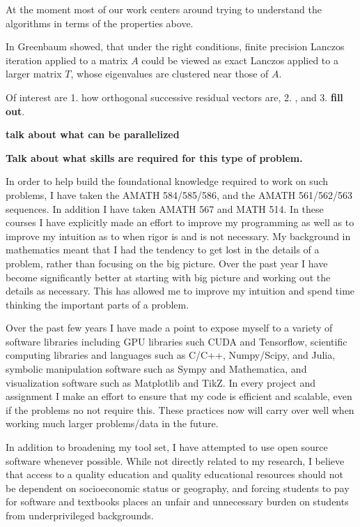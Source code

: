 \documentclass[11pt]{article}
\begin{document}
At the moment most of our work centers around trying to understand the algorithms in terms of the properties above. 

In \cite{perturbed_lanczos} Greenbaum showed, that under the right conditions, finite precision Lanczos iteration applied to a matrix \( A \) could be viewed as exact Lanczos applied to a larger matrix \( T \), whose eigenvalues are clustered near those of \( A \).

Of interest are 1. how orthogonal successive residual vectors are, 2. , and 3. \textbf{fill out}.


\textbf{talk about what can be parallelized}


\textbf{Talk about what skills are required for this type of problem.}




In order to help build the foundational knowledge required to work on such problems, I have taken the AMATH 584/585/586, and the AMATH 561/562/563 sequences. In addition I have taken AMATH 567 and MATH 514. In these courses I have explicitly made an effort to improve my programming as well as to improve my intuition as to when rigor is and is not necessary. My background in mathematics meant that I had the tendency to get lost in the details of a problem, rather than focusing on the big picture. Over the past year I have become significantly better at starting with big picture and working out the details as necessary. This has allowed me to improve my intuition and spend time thinking the important parts of a problem.

Over the past few years I have made a point to expose myself to a variety of software libraries including GPU libraries such CUDA and Tensorflow, scientific computing libraries and languages such as C/C++, Numpy/Scipy, and Julia, symbolic manipulation software such as Sympy and Mathematica, and visualization software such as Matplotlib and TikZ. In every project and assignment I make an effort to ensure that my code is efficient and scalable, even if the problems no not require this. These practices now will carry over well when working much larger problems/data in the future.

In addition to broadening my tool set, I have attempted to use open source software whenever possible. While not directly related to my research, I believe that access to a quality education and quality educational resources should not be dependent on socioeconomic status or geography, and forcing students to pay for software and textbooks places an unfair and unnecessary burden on students from underprivileged backgrounds. 
\end{document}
